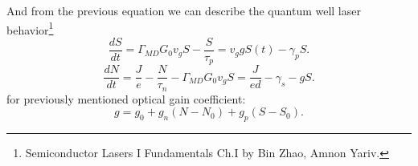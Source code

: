 And from the previous equation we can describe the quantum well laser behavior\footnote{
    Semiconductor
Lasers I
Fundamentals Ch.I by Bin Zhao, Amnon Yariv.
}
\begin{equation*}
	\frac{d S}{d t} = \Gamma_{MD} G_0 v_g S - \frac{S}{\tau_p} = v_g g S(t) - \gamma_p S. 
\end{equation*}
\begin{equation*}
	\frac{d N}{d t} = \frac{J}{e} - \frac{N}{\tau_n} - \Gamma_{MD} G_0 v_g S = \frac{J}{e d} - \gamma_s - g S.
\end{equation*}
for previously mentioned optical gain coefficient:
\begin{equation*}
	g = g_0 + g_n(N-N_0) + g_p(S - S_0).
\end{equation*}
